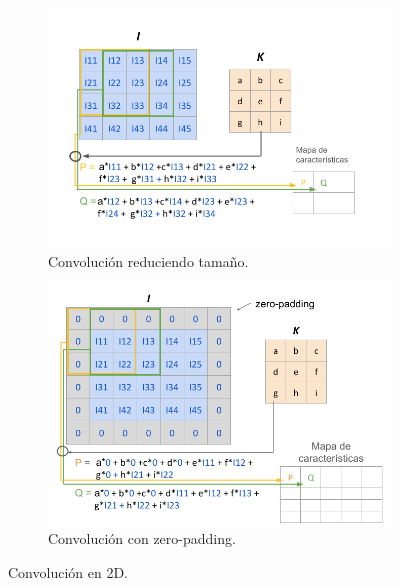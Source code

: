 \begin{figure}[h] 
     \centering
     \begin{subfigure}[b]{0.45\textwidth}
         \centering
         \includegraphics[width=\textwidth]{img/convolucion.png}
         \caption{Convolución reduciendo tamaño.}
         \label{fig:convolucion}
     \end{subfigure}
     \hfill
     \begin{subfigure}[b]{0.45\textwidth}
         \centering
         \includegraphics[width=1\textwidth]{img/convolucionPadding.png}
         \caption{Convolución con zero-padding.}
         \label{fig:convolucionPadding}
     \end{subfigure}
     \caption{Convolución en 2D.}
     \label{fig:convolu2}
\end{figure} 

